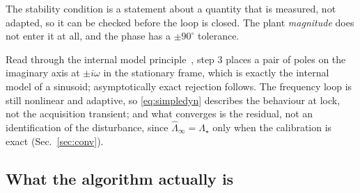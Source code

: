 \documentclass[11pt]{article}
\begin{document}
The stability condition is a statement about a quantity that is measured, not adapted, so it can be checked before the loop is closed. The plant \emph{magnitude} does not enter it at all, and the phase has a $\pm90^\circ$ tolerance.
%

Read through the internal model principle~\cite{francis1976}, step 3 places a pair of poles on the imaginary axis at $\pm i\omega$ in the stationary frame, which is exactly the internal model of a sinusoid; asymptotically exact rejection follows.
%
The frequency loop is still nonlinear and adaptive, so \eqref{eq:simpledyn} describes the behaviour at lock, not the acquisition transient; and what converges is the residual, not an identification of the disturbance, since $\hat\Lambda_\infty=\Lambda_\star$ only when the calibration is exact (Sec.~\ref{sec:conv}).

\subsection{What the algorithm actually is}
\label{sec:whatitis}
\end{document}
